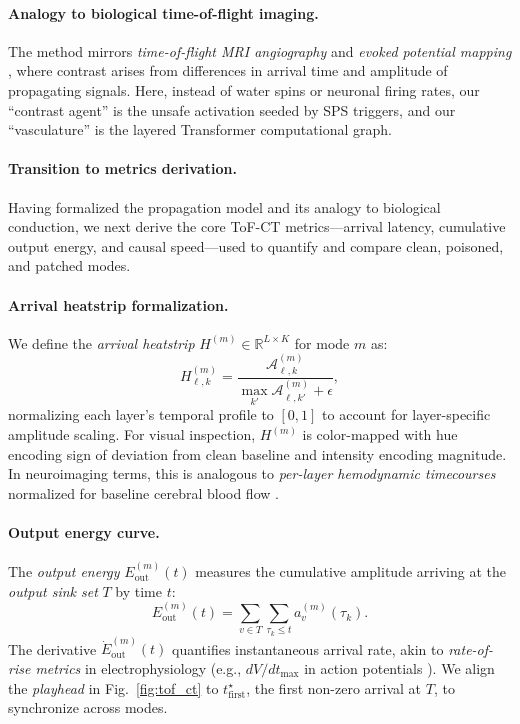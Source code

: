 \documentclass[11pt]{article}
\begin{document}
\paragraph{Analogy to biological time-of-flight imaging.}  
The method mirrors \emph{time-of-flight MRI angiography} \citep{brittain1995technical} and \emph{evoked potential mapping} \citep{nunez2006electric}, where contrast arises from differences in arrival time and amplitude of propagating signals.  
Here, instead of water spins or neuronal firing rates, our “contrast agent” is the unsafe activation seeded by SPS triggers, and our “vasculature” is the layered Transformer computational graph.

\paragraph{Transition to metrics derivation.}  
Having formalized the propagation model and its analogy to biological conduction, we next derive the core ToF-CT metrics—arrival latency, cumulative output energy, and causal speed—used to quantify and compare clean, poisoned, and patched modes.

\paragraph{Arrival heatstrip formalization.}  
We define the \emph{arrival heatstrip} $H^{(m)} \in \mathbb{R}^{L \times K}$ for mode $m$ as:
\[
H^{(m)}_{\ell,k} = \frac{\mathcal{A}^{(m)}_{\ell,k}}{\max_{k'} \mathcal{A}^{(m)}_{\ell,k'} + \epsilon},
\]
normalizing each layer’s temporal profile to $[0,1]$ to account for layer-specific amplitude scaling.  
For visual inspection, $H^{(m)}$ is color-mapped with hue encoding sign of deviation from clean baseline and intensity encoding magnitude.  
In neuroimaging terms, this is analogous to \emph{per-layer hemodynamic timecourses} normalized for baseline cerebral blood flow \citep{heiss2012ischemic}.

\paragraph{Output energy curve.}  
The \emph{output energy} $E^{(m)}_{\mathrm{out}}(t)$ measures the cumulative amplitude arriving at the \emph{output sink set} $T$ by time $t$:
\[
E^{(m)}_{\mathrm{out}}(t) = \sum_{v \in T} \sum_{\tau_k \le t} a^{(m)}_v(\tau_k).
\]
The derivative $\dot{E}^{(m)}_{\mathrm{out}}(t)$ quantifies instantaneous arrival rate, akin to \emph{rate-of-rise metrics} in electrophysiology (e.g., $dV/dt_{\max}$ in action potentials \citep{hodgkin1952quantitative}).  
We align the \emph{playhead} in Fig.~\ref{fig:tof_ct} to $t^\star_{\mathrm{first}}$, the first non-zero arrival at $T$, to synchronize across modes.
\end{document}
